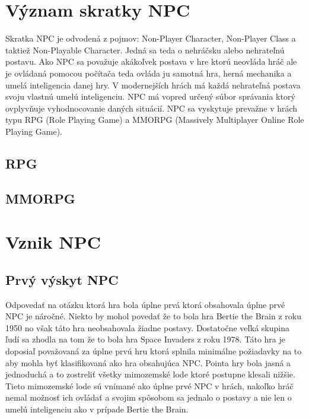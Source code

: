 \documentclass[10pt,twoside,slovak,a4paper]{article}
\begin{document}
\section{Význam skratky NPC}  \label{Vyznam skratky}
Skratka NPC je odvodená z pojmov: Non-Player Character, Non-Player Class a taktiež Non-Playable Character. Jedná sa teda o nehráčsku alebo nehrateľnú postavu. Ako NPC sa považuje akákoľvek postava v hre ktorú neovláda hráč ale je ovládaná pomocou počítača teda ovláda ju samotná hra, herná mechanika a umelá inteligencia danej hry. V modernejších hrách má každá nehrateľná postava svoju vlastnú umelú inteligenciu. NPC má vopred určený súbor správania ktorý ovplyvňuje vyhodnocovanie daných situácií. NPC sa vyskytuje prevažne v hrách typu RPG (Role Playing Game) a MMORPG (Massively Multiplayer Online Role Playing Game).

\subsection{RPG} \label{RPG}

\subsection{MMORPG} \label{MMORPG}

\section{Vznik NPC}
\subsection{Prvý výskyt NPC} \label{NPC 1 time}
Odpovedať na otázku ktorá hra bola úplne prvá ktorá obsahovala úplne prvé NPC je náročné. Niekto by mohol povedať že to bola hra Bertie the Brain z roku 1950 no však táto hra neobsahovala žiadne postavy. Dostatočne veľká skupina ľudí sa zhodla na tom že to bola hra Space Invaders z roku 1978. Táto hra je doposiaľ považovaná za úplne prvú hru ktorá splnila minimálne požiadavky na to aby mohla byť klasifikovaná ako hra obsahujúca NPC. Pointa hry bola jasná a jednoduchá a to zostreliť všetky mimozemské lode ktoré postupne klesali nižšie. Tieto mimozemské lode sú vnímané ako úplne prvé NPC v hrách, nakoľko hráč nemal možnosť ich ovládať a svojim spôsobom sa jednalo o postavy a nie len o umelú inteligenciu ako v prípade Bertie the Brain.  
\end{document}
